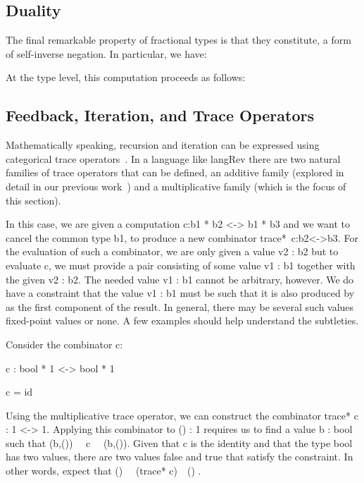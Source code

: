 \documentclass{llncs}
\begin{document}
\subsection{Duality}

The final remarkable property of fractional types is that they
constitute, a form of self-inverse negation. In particular, we have:


\noindent At the type level, this computation proceeds as follows:


\subsection{Feedback, Iteration, and Trace Operators}

Mathematically speaking, recursion and iteration can be expressed using
categorical trace
operators~\cite{joyal1996traced,Hasegawa:1997:RCS:645893.671607}.  In a
language like {{langRev}} there are two natural families of trace operators
that can be defined, an additive family (explored in detail in our previous
work~\cite{rc2011}) and a multiplicative family (which is the focus of this
section).

In this case, we are given a computation {{c:b1 * b2 <-> b1 * b3}} and we
want to cancel the common type {{b1}}, to produce a new combinator
{{trace*~c:b2<->b3}}. For the evaluation of such a combinator, we are only
given a value {{v2 : b2}} but to evaluate {{c}}, we must provide a pair
consisting of some value {{v1 : b1}} together with the given {{v2 : b2}}. The
needed value {{v1 : b1}} cannot be arbitrary, however. We do have a
constraint that the value {{v1 : b1}} must be such that it is also produced
by as the first component of the result. In general, there may be several
such values fixed-point values or none.  A few examples should help
understand the subtleties.

\begin{example}
Consider the combinator {{c}}:

{{c : bool * 1 <-> bool * 1}} 

{{c = id}}

\noindent Using the multiplicative trace operator, we can construct the
combinator {{trace* c : 1 <-> 1}}. Applying this combinator to 
{{() : 1}} requires us to find a value {{b : bool}} such that 
{{(b,()) ~~c~~ (b,())}}. Given that {{c}} is the identity and that the type {{bool}} 
has two values, there are two values {{false}} and {{true}} that satisfy the 
constraint. In other words, expect that {{() ~~(trace* c)~~() }}.
\end{example}
\end{document}
